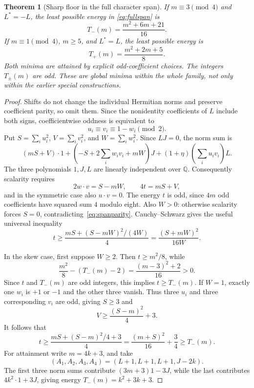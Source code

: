 \documentclass[11pt]{article}
\newtheorem{theorem}{Theorem}[section]
\begin{document}
\begin{theorem}[Sharp floor in the full character span]\label{thm:spanfloor}
If $m\equiv3\pmod4$ and $L^*=-L$, the least possible energy in
\eqref{eq:fullspan} is
\[
 T_-(m)=\frac{m^2+6m+21}{16}.
\]
If $m\equiv1\pmod4$, $m\ge5$, and $L^*=L$, the least possible energy is
\[
 T_+(m)=\frac{m^2+2m+5}{8}.
\]
Both minima are attained by explicit odd-coefficient choices. The
integers $T_\pm(m)$ are odd. These are global minima within the whole
family, not only within the earlier special constructions.
\end{theorem}
\begin{proof}
Shifts do not change the individual Hermitian norms and preserve
coefficient parity, so omit them. Since the nonidentity coefficients
of $L$ include both signs, coefficientwise oddness is equivalent to
\begin{equation}\label{eq:spanparity}
 u_i\equiv v_i\equiv1-w_i\pmod2.
\end{equation}
Put $S=\sum_i u_i^2$, $V=\sum_i v_i^2$, and $W=\sum_i w_i^2$.
Since $LJ=0$, the norm sum is
\[
 (mS+V)\cdot1+
 \left(-S+2\sum_iw_iv_i+mW\right)J
 +(1+\eta)\left(\sum_i u_iv_i\right)L.
\]
The three polynomials $1,J,L$ are linearly independent over $\mathbb Q$.
Consequently scalarity requires
\begin{equation}\label{eq:spanconditions}
 2w\mathbin{\cdot}v=S-mW,\qquad 4t=mS+V,
\end{equation}
and in the symmetric case also $u\mathbin{\cdot}v=0$.
The energy $t$ is odd, since $4m$ odd coefficients have squared sum
$4$ modulo eight. Also $W>0$: otherwise scalarity forces $S=0$,
contradicting~\eqref{eq:spanparity}. Cauchy--Schwarz gives the useful
universal inequality
\begin{equation}\label{eq:spanCS}
 t\ge\frac{mS+(S-mW)^2/(4W)}4
   =\frac{(S+mW)^2}{16W}.
\end{equation}

In the skew case, first suppose $W\ge2$. Then $t\ge m^2/8$, while
\[
 \frac{m^2}{8}-(T_-(m)-2)
 =\frac{(m-3)^2+2}{16}>0.
\]
Since $t$ and $T_-(m)$ are odd integers, this implies $t\ge T_-(m)$.
If $W=1$, exactly one $w_i$ is $+1$ or $-1$ and the other three
vanish. Thus three $u_i$ and three corresponding $v_i$ are odd,
giving $S\ge3$ and
\[
 V\ge\frac{(S-m)^2}{4}+3.
\]
It follows that
\[
 t\ge\frac{mS+(S-m)^2/4+3}{4}
 =\frac{(m+S)^2}{16}+\frac34
 \ge T_-(m).
\]
For attainment write $m=4k+3$, and take
\[
 (A_1,A_2,A_3,A_4)=(L+1,L+1,L+1,J-2k).
\]
The first three norm sums contribute $(3m+3)1-3J$, while the last
contributes $4k^2\cdot1+3J$, giving energy $T_-(m)=k^2+3k+3$.


\end{proof}
\end{document}
